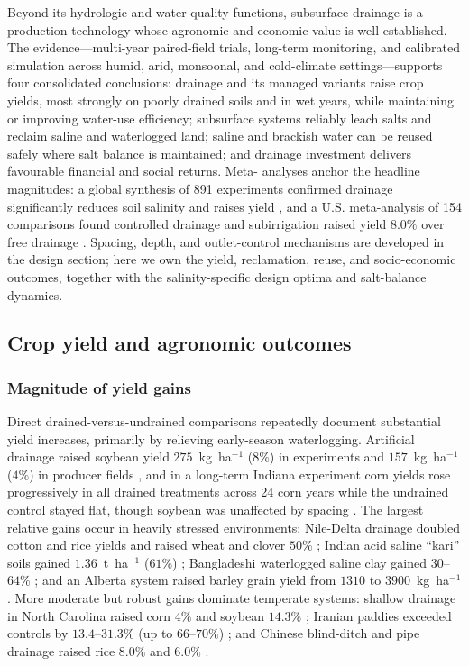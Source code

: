 Beyond its hydrologic and water-quality functions, subsurface drainage is a
production technology whose agronomic and economic value is well established.
The evidence---multi-year paired-field trials, long-term monitoring, and
calibrated simulation across humid, arid, monsoonal, and cold-climate
settings---supports four consolidated conclusions: drainage and its managed
variants raise crop yields, most strongly on poorly drained soils and in wet
years, while maintaining or improving water-use efficiency; subsurface systems
reliably leach salts and reclaim saline and waterlogged land; saline and
brackish water can be reused safely where salt balance is maintained; and
drainage investment delivers favourable financial and social returns. Meta-
analyses anchor the headline magnitudes: a global synthesis of 891 experiments
confirmed drainage significantly reduces soil salinity and raises yield
\parencite{Yang2025}, and a U.S. meta-analysis of 154 comparisons found
controlled drainage and subirrigation raised yield $8.0\%$ over free drainage
\parencite{Singh2022b}. Spacing, depth, and outlet-control mechanisms are
developed in the design section; here we own the yield, reclamation, reuse, and
socio-economic outcomes, together with the salinity-specific design optima and
salt-balance dynamics.

\subsection{Crop yield and agronomic outcomes}

\subsubsection{Magnitude of yield gains}

Direct drained-versus-undrained comparisons repeatedly document substantial
yield increases, primarily by relieving early-season waterlogging. Artificial
drainage raised soybean yield $275$~kg~ha$^{-1}$ ($8\%$) in experiments and
$157$~kg~ha$^{-1}$ ($4\%$) in producer fields \parencite{Mourtzinis2021}, and in
a long-term Indiana experiment corn yields rose progressively in all drained
treatments across 24 corn years while the undrained control stayed flat, though
soybean was unaffected by spacing \parencite{Rui2024,Kladivko2005}. The largest
relative gains occur in heavily stressed environments: Nile-Delta drainage
doubled cotton and rice yields and raised wheat and clover $50\%$
\parencite{ELMOWELHI1988}; Indian acid saline ``kari'' soils gained
$1.36$~t~ha$^{-1}$ ($61\%$) \parencite{Mathew2001}; Bangladeshi waterlogged
saline clay gained $30$--$64\%$ \parencite{Islam2025,Islam2022}; and an Alberta
system raised barley grain yield from $1310$ to $3900$~kg~ha$^{-1}$
\parencite{BENNETT1982}. More moderate but robust gains dominate temperate
systems: shallow drainage in North Carolina raised corn $4\%$ and soybean
$14.3\%$ \parencite{Watkins2024}; Iranian paddies exceeded controls by
$13.4$--$31.3\%$ (up to $66$--$70\%$) \parencite{DarziNaftchali2017b,DarziNaftchali2014};
and Chinese blind-ditch and pipe drainage raised rice $8.0\%$ and $6.0\%$
\parencite{Qi2025b}.

